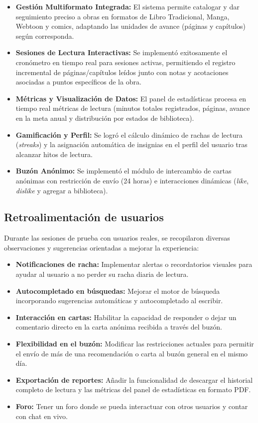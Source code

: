 \documentclass[12pt, atypical, journal]{article}
\begin{document}
\begin{itemize}
	\item \textbf{Gestión Multiformato Integrada:} El sistema permite catalogar y dar seguimiento preciso a obras en formatos de Libro Tradicional, Manga, Webtoon y comics, adaptando las unidades de avance (páginas y capítulos) según corresponda.
	
	\item \textbf{Sesiones de Lectura Interactivas:} Se implementó exitosamente el cronómetro en tiempo real para sesiones activas, permitiendo el registro incremental de páginas/capítulos leídos junto con notas y acotaciones asociadas a puntos específicos de la obra.
	
	\item \textbf{Métricas y Visualización de Datos:} El panel de estadísticas procesa en tiempo real métricas de lectura (minutos totales registrados, páginas, avance en la meta anual y distribución por estados de biblioteca).
	
	\item \textbf{Gamificación y Perfil:} Se logró el cálculo dinámico de rachas de lectura (\textit{streaks}) y la asignación automática de insignias en el perfil del usuario tras alcanzar hitos de lectura.
	
	\item \textbf{Buzón Anónimo:} Se implementó el módulo de intercambio de cartas anónimas con restricción de envío (24 horas) e interacciones dinámicas (\textit{like}, \textit{dislike} y agregar a biblioteca).
\end{itemize}

\subsection{Retroalimentación de usuarios}
Durante las sesiones de prueba con usuarios reales, se recopilaron diversas observaciones y sugerencias orientadas a mejorar la experiencia:

\begin{itemize}
	\item \textbf{Notificaciones de racha:} Implementar alertas o recordatorios visuales para ayudar al usuario a no perder su racha diaria de lectura.
	\item \textbf{Autocompletado en búsquedas:} Mejorar el motor de búsqueda incorporando sugerencias automáticas y autocompletado al escribir.
	\item \textbf{Interacción en cartas:} Habilitar la capacidad de responder o dejar un comentario directo en la carta anónima recibida a través del buzón.
	\item \textbf{Flexibilidad en el buzón:} Modificar las restricciones actuales para permitir el envío de más de una recomendación o carta al buzón general en el mismo día.
	\item \textbf{Exportación de reportes:} Añadir la funcionalidad de descargar el historial completo de lectura y las métricas del panel de estadísticas en formato PDF.
	\item \textbf{Foro:} Tener un foro donde se pueda interactuar con otros usuarios y contar con chat en vivo.
\end{itemize}
\end{document}
